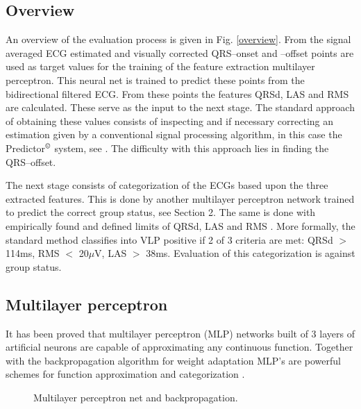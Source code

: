 \documentclass[twocolumn]{cinc}
\begin{document}
\subsection{Overview}

An overview of the evaluation process is given in Fig. \ref{overview}. From the signal averaged ECG
estimated and visually corrected QRS--onset and --offset points are used as target values for the 
training of the feature extraction multilayer perceptron. This neural net is trained to predict these
points from the bidirectional filtered ECG. From these points the features QRSd, LAS and RMS are
calculated. These serve as the input to the next stage. The standard approach of obtaining these
values consists of inspecting and if necessary correcting an estimation given by a conventional
signal processing algorithm, in this case the Predictor$^\copyright$ system, see \cite{med:breithardt91}. 
The difficulty with this approach lies in finding the QRS--offset. 

The next stage consists of categorization of the ECGs based upon the three extracted features. This
is done by another multilayer perceptron network trained to predict the correct group status, see Section 2.
The same is done with empirically found and defined limits of QRSd, LAS and RMS \cite{med:breithardt91}.
More formally, the standard method classifies into VLP positive if 2 of 3 
criteria are met: QRSd $>$ 114ms, RMS $<$ 20$\mu$V, LAS $>$ 38ms. Evaluation of this categorization
is against group status.

\begin{figure*}[h] 
\vspace*{-2cm}
\centerline{}
\caption{Overview of the decision process incorporating neural and standard methods.}
\label{overview} %
\end{figure*}



\subsection{Multilayer perceptron}

It has been proved that multilayer perceptron (MLP) networks built of 3 layers
of artificial neurons are capable of approximating any continuous function.
Together with the backpropagation algorithm for weight adaptation MLP's
are powerful schemes for function approximation and categorization \cite{nn:haykin99}.
\begin{figure}[ht]
\vspace {-.5cm} 
\centerline{}
\vspace*{.5cm}
\centerline{\hspace*{0cm}}
\vspace{.3cm}
\caption{Multilayer perceptron net and backpropagation.}
\label{mlp1} \vspace*{-15mm} 
\end{figure}
\end{document}
